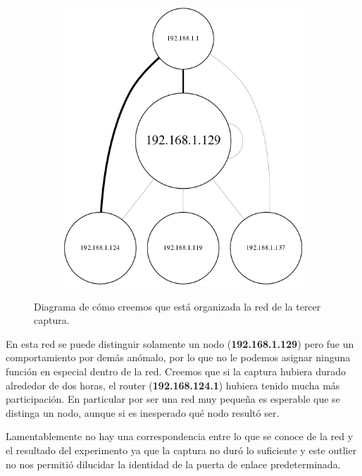 \begin{figure}[h]
  \begin{subfigure}{.5\textwidth}
    \includegraphics[width=\textwidth]{imagenes/mini_red/mini_red_Red.png}
  \end{subfigure}
  \label{fig:exp3_red}
  \caption{Diagrama de cómo creemos que está organizada la red de la tercer captura.}
\end{figure}

\par En esta red se puede distinguir solamente un nodo (\textbf{192.168.1.129}) pero fue un comportamiento por demás anómalo, por lo que no le podemos asignar ninguna función en especial dentro de la red. Creemos que si la captura hubiera durado alrededor de dos horas, el router (\textbf{192.168.124.1}) hubiera tenido mucha más participación. En particular por ser una red muy pequeña es esperable que se distinga un nodo, aunque si es inesperado qué nodo resultó ser.

\par Lamentablemente no hay una correspondencia entre lo que se conoce de la red y el resultado del experimento ya que la captura no duró lo suficiente y este outlier no nos permitió dilucidar la identidad de la puerta de enlace predeterminada.


